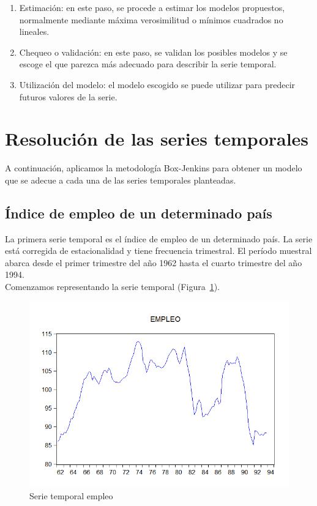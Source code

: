 \documentclass[12pt,a4paper,twoside,openright,titlepage,final]{article}
\begin{document}
\begin{enumerate}
	\item Estimación: en este paso, se procede a estimar los modelos propuestos, normalmente mediante máxima verosimilitud o mínimos cuadrados no lineales. 
	
	\item Chequeo o validación: en este paso, se validan los posibles modelos y se escoge el que parezca más adecuado para describir la serie temporal.
	
	\item Utilización del modelo: el modelo escogido se puede utilizar para predecir futuros valores de la serie.
\end{enumerate}

\section{Resolución de las series temporales}

A continuación, aplicamos la metodología Box-Jenkins para obtener un modelo que se adecue a cada una de las series temporales planteadas. 

\subsection{Índice de empleo de un determinado país}

La primera serie temporal es el índice de empleo de un determinado país. La serie está corregida de estacionalidad y tiene frecuencia trimestral. El período muestral abarca desde el primer trimestre del año 1962 hasta el cuarto trimestre del año 1994.\\

Comenzamos representando la serie temporal (Figura~\ref{fig:empleo}).

\begin{figure}[tbph!]
\centering
\includegraphics[width=0.8\linewidth]{imagenes/empleo/empleo.png}
\caption{Serie temporal empleo}
\label{fig:empleo}
\end{figure}
\end{document}
